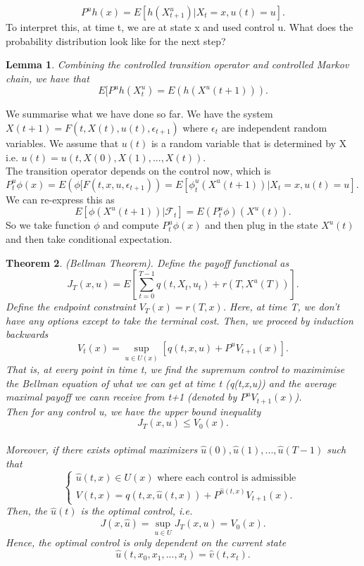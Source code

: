 \documentclass[twoside]{article}
\newcounter{lecnum}
\newtheorem{theorem}{Theorem}[lecnum]
\newtheorem{lemma}[theorem]{Lemma}
\begin{document}
$$
P^uh(x) = E[h(X_{t+1}^{u})|X_t=x, u(t)=u].
$$
To interpret this, at time t, we are at state x and used control u. What does the probability distribution look like for the next step?

\begin{lemma}Combining the controlled transition operator and controlled Markov chain, we have that $$E[P^uh(X_{t}^{u}) = E(h(X^u(t+1))).$$ 
\end{lemma}

We summarise what we have done so far. We have the system $X(t+1) = F(t,X(t),u(t),\epsilon_{t+1})$ where $\epsilon_t$ are independent random variables. We assume that $u(t)$ is a random variable that is determined by X i.e. $u(t) = u(t,X(0),X(1),...,X(t)).$ \\The transition operator depends on the control now, which is $P_{t}^{u}\phi(x) = E(\phi[F(t,x,u,\epsilon_{t+1})) = E[\phi_{t}^{u}(X^u(t+1))|X_t=x,u(t)=u].$ We can re-express this as $$E[\phi(X^u(t+1))|\mathcal{F}_t] = E(P_{t}^{u}\phi)(X^u(t)).$$ So we take function $\phi$ and compute $P_t^u\phi(x)$ and then plug in the state $X^u(t)$ and then take conditional expectation.\\

\begin{theorem}(Bellman Theorem). Define the payoff functional as 
$$
J_T(x,u) = E[\sum_{t=0}^{T-1}q(t,X_t,u_t) + r(T,X^u(T))].
$$
Define the endpoint constraint $V_T(x) = r(T,x)$. Here, at time T, we don't have any options except to take the terminal cost. Then, we proceed by induction backwards
$$
V_t(x) = \sup_{u \in U(x)}[q(t,x,u) + P^uV_{t+1}(x)].
$$
That is, at every point in time t, we find the supremum control to maximimise the Bellman equation of what we can get at time t (q(t,x,u)) and the average maximal payoff we cann receive from t+1 (denoted by $P^uV_{t+1}(x)$).\\

Then for any control u, we have the upper bound inequality
$$
J_T(x,u) \leq V_0(x).
$$\\

Moreover, if there exists optimal maximizers $\hat{u}(0),\hat{u}(1),...,\hat{u}(T-1)$ such that 
$$
\begin{cases}
\hat{u}(t,x) \in U(x) \text{ where each control is admissible } \\
V(t,x) = q(t,x,\hat{u}(t,x)) + P^{\hat{u}(t,x)}V_{t+1}(x).
\end{cases}
$$
Then, the $\hat{u}(t)$ is the optimal control, i.e. 
$$
J(x,\hat{u}) = \sup_{u \in U}J_T(x,u) = V_0(x).
$$
Hence, the optimal control is only dependent on the current state
$$
\hat{u}(t,x_0,x_1,...,x_t) = \hat{v}(t,x_t).
$$
\end{theorem}
\end{document}

